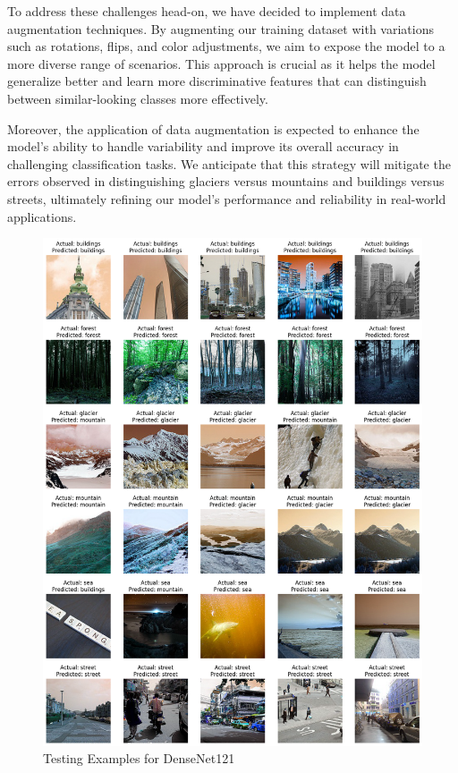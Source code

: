 \documentclass[conference]{IEEEtran}
\begin{document}
To address these challenges head-on, we have decided to implement data augmentation techniques. By augmenting our training dataset with variations such as rotations, flips, and color adjustments, we aim to expose the model to a more diverse range of scenarios. This approach is crucial as it helps the model generalize better and learn more discriminative features that can distinguish between similar-looking classes more effectively.

Moreover, the application of data augmentation is expected to enhance the model's ability to handle variability and improve its overall accuracy in challenging classification tasks. We anticipate that this strategy will mitigate the errors observed in distinguishing glaciers versus mountains and buildings versus streets, ultimately refining our model's performance and reliability in real-world applications.

\begin{figure}[H]
    \centering
    \includegraphics[width=1\linewidth]{images//DenseNet/TestingExamplesDenseNet.png}
    \caption{Testing Examples for DenseNet121}
    \label{fig:Examples_DenseNet}
\end{figure}
\end{document}
